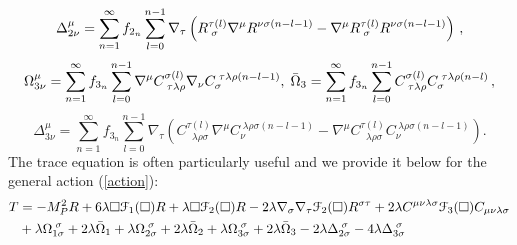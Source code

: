 \[\nonumber
\Delta_{2\nu}^{\mu}=\sum_{n=1}^{\infty}f_{2_{n}}\sum_{l=0}^{n-1}\nabla_{\tau}\left(R_{\;\sigma}^{\tau(l)}\nabla^{\mu}R^{\nu\sigma(n-l-1)}-\nabla^{\mu}R_{\;\sigma}^{\tau(l)}R^{\nu\sigma(n-l-1)}\right)\,,
 \]
\[\nonumber
\Omega_{3\nu}^{\mu}=\sum_{n=1}^{\infty}f_{3_{n}}\sum_{l=0}^{n-1}\nabla^{\mu}C_{\;\tau\lambda\rho}^{\sigma(l)}\nabla_{\nu}C_{\sigma}^{\;\tau\lambda\rho(n-l-1)},\;\bar{\Omega}_{3}=\sum_{n=1}^{\infty}f_{3_{n}}\sum_{l=0}^{n-1}C_{\;\tau\lambda\rho}^{\sigma(l)}C_{\sigma}^{\;\tau\lambda\rho(n-l)}\,,
 \]
\[
\Delta_{3\nu}^{\mu}=\sum_{n=1}^{\infty}f_{3_{n}}\sum_{l=0}^{n-1}\nabla_{\tau}\left(C_{\;\;\lambda\rho\sigma}^{\tau(l)}\nabla^{\mu}C_{\nu}^{\;\lambda\rho\sigma(n-l-1)}-\nabla^{\mu}C_{\;\;\lambda\rho\sigma}^{\tau(l)}C_{\nu}^{\;\lambda\rho\sigma(n-l-1)}\right).
 \]
The trace equation is often particularly useful and we provide it below for the
general action (\ref{action}):
\begin{align}
T	&=	-M_{P}^{2}R+6\lambda\square{\cal F}_{1}(\Box)R+\lambda\square{\cal F}_{2}(\Box)R-2\lambda\nabla_{\sigma}\nabla_{\tau}{\cal F}_{2}(\Box)R^{\sigma\tau}+2\lambda C^{\mu\nu\lambda\sigma}{\cal F}_{3}(\Box)C_{\mu\nu\lambda\sigma}
	\nonumber\\&	+\lambda\Omega_{1\sigma}^{\;\sigma}+2\lambda\bar{\Omega}_{1}+\lambda\Omega_{2\sigma}^{\;\sigma}+2\lambda\bar{\Omega}_{2}+\lambda\Omega_{3\sigma}^{\;\sigma}+2\lambda\bar{\Omega}_{3}-2\lambda\Delta_{2\sigma}^{\;\sigma}-4\lambda\Delta_{3\sigma}^{\;\sigma}
 \label{trace}
\end{align}

